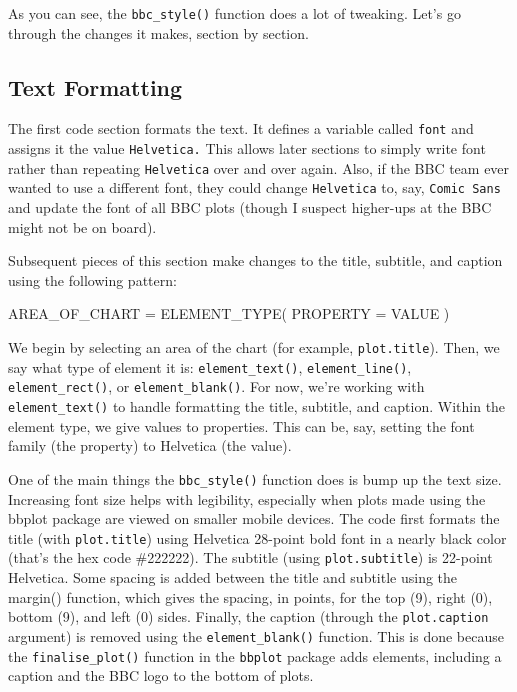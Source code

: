 \documentclass[
]{book}
\newenvironment{Shaded}{\begin{snugshade}}{\end{snugshade}}
\newcommand{\AttributeTok}[1]{\textcolor[rgb]{0.77,0.63,0.00}{#1}}
\newcommand{\FunctionTok}[1]{\textcolor[rgb]{0.00,0.00,0.00}{#1}}
\newcommand{\NormalTok}[1]{#1}
\newcommand{\OtherTok}[1]{\textcolor[rgb]{0.56,0.35,0.01}{#1}}
\begin{document}
As you can see, the \texttt{bbc\_style()} function does a lot of tweaking. Let's go through the changes it makes, section by section.

\hypertarget{text-formatting}{%
\subsection*{Text Formatting}\label{text-formatting}}

The first code section formats the text. It defines a variable called \texttt{font} and assigns it the value \texttt{Helvetica.} This allows later sections to simply write font rather than repeating \texttt{Helvetica} over and over again. Also, if the BBC team ever wanted to use a different font, they could change \texttt{Helvetica} to, say, \texttt{Comic\ Sans} and update the font of all BBC plots (though I suspect higher-ups at the BBC might not be on board).

Subsequent pieces of this section make changes to the title, subtitle, and caption using the following pattern:

\begin{Shaded}
\begin{Highlighting}[]
\NormalTok{AREA\_OF\_CHART }\OtherTok{=} \FunctionTok{ELEMENT\_TYPE}\NormalTok{(}
  \AttributeTok{PROPERTY =}\NormalTok{ VALUE}
\NormalTok{)}
\end{Highlighting}
\end{Shaded}

We begin by selecting an area of the chart (for example, \texttt{plot.title}). Then, we say what type of element it is: \texttt{element\_text()}, \texttt{element\_line()}, \texttt{element\_rect()}, or \texttt{element\_blank()}. For now, we're working with \texttt{element\_text()} to handle formatting the title, subtitle, and caption. Within the element type, we give values to properties. This can be, say, setting the font family (the property) to Helvetica (the value).

One of the main things the \texttt{bbc\_style()} function does is bump up the text size. Increasing font size helps with legibility, especially when plots made using the bbplot package are viewed on smaller mobile devices. The code first formats the title (with \texttt{plot.title}) using Helvetica 28-point bold font in a nearly black color (that's the hex code \#222222). The subtitle (using \texttt{plot.subtitle}) is 22-point Helvetica. Some spacing is added between the title and subtitle using the margin() function, which gives the spacing, in points, for the top (9), right (0), bottom (9), and left (0) sides. Finally, the caption (through the \texttt{plot.caption} argument) is removed using the \texttt{element\_blank()} function. This is done because the \texttt{finalise\_plot()} function in the \texttt{bbplot} package adds elements, including a caption and the BBC logo to the bottom of plots.
\end{document}
